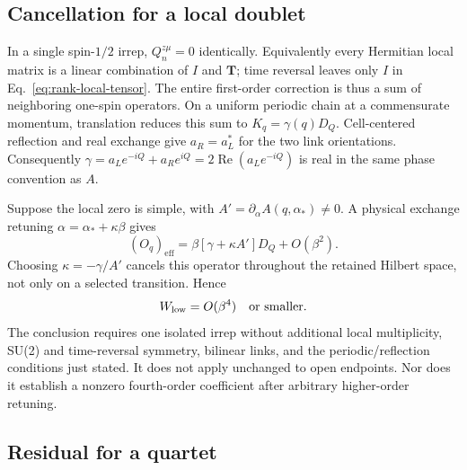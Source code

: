 \subsection{Cancellation for a local doublet}

In a single spin-$1/2$ irrep, $Q_n^{z\mu}=0$ identically. Equivalently every
Hermitian local matrix is a linear combination of $I$ and $\bm T$; time
reversal leaves only $I$ in Eq.~\eqref{eq:rank-local-tensor}.
The entire first-order correction is thus a sum of neighboring one-spin
operators. On a uniform periodic chain at a commensurate momentum, translation
reduces this sum to $K_q=\gamma(q)D_Q$. Cell-centered reflection and real
exchange give $a_R=a_L^*$ for the two link orientations. Consequently
$\gamma=a_L e^{-iQ}+a_R e^{iQ}=2\operatorname{Re}(a_L e^{-iQ})$
is real in the same phase convention as $A$.

Suppose the local zero is simple, with
$A'=\partial_\alpha A(q,\alpha_*)\ne0$. A physical exchange retuning
$\alpha=\alpha_*+\kappa\beta$ gives
\begin{equation}
 (O_q)_{\mathrm{eff}}
   =\beta[\gamma+\kappa A']D_Q+O(\beta^2).
\end{equation}
Choosing $\kappa=-\gamma/A'$ cancels this operator throughout the retained
Hilbert space, not only on a selected transition. Hence
\begin{equation}
 W_{\mathrm{low}}=O(\beta^4)\quad\text{or smaller}.
 \label{eq:rank-doublet}
\end{equation}
The conclusion requires one isolated irrep without additional local
multiplicity, SU(2) and time-reversal symmetry, bilinear links, and the
periodic/reflection conditions just stated. It does not apply unchanged to
open endpoints. Nor does it establish a nonzero fourth-order coefficient
after arbitrary higher-order retuning.

\subsection{Residual for a quartet}

